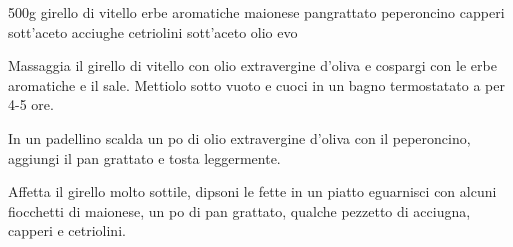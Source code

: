 \begin{ingreds}
	500g girello di vitello 
	erbe aromatiche
	maionese 
	pangrattato 
	peperoncino 
	capperi  sott'aceto
	acciughe 
	cetriolini sott'aceto 
	olio evo
\end{ingreds}

\begin{method}
Massaggia il girello di vitello con olio extravergine d'oliva e cospargi con le erbe aromatiche e il sale. Mettiolo sotto vuoto e cuoci in un bagno termostatato a  per 4-5 ore.

In un padellino scalda un po di olio extravergine d'oliva con il peperoncino, aggiungi il pan grattato e tosta leggermente.

Affetta il girello molto sottile, dipsoni le fette in un piatto eguarnisci con alcuni fiocchetti di maionese, un po di pan grattato, qualche pezzetto di acciugna, capperi e cetriolini.
\end {method}
